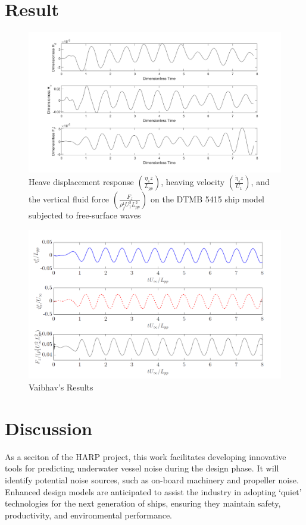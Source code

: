 \documentclass[12pt]{article} %
\begin{document}
\section{Result}
\begin{figure}[ht]
    \centering
    \includegraphics[width=1\textwidth]{Myresults.png}
    \caption{Heave displacement response \(\left(\frac{\eta_s z}{L_{pp}}\right)\), heaving velocity \(\left(\frac{\dot{\eta}_s z}{U_1}\right)\), and the vertical fluid force \(\left(\frac{F_z}{\rho_f^1 U_1^2 L_{pp}^2}\right)\) on the DTMB 5415 ship model subjected to free-surface waves
    }
\end{figure}
\begin{figure}[ht]
    \centering
    \includegraphics[width=1\textwidth]{Vabhav'sresults.png}
    \caption{Vaibhav's Results}
\end{figure}

\clearpage
\section{Discussion}
As a seciton of the HARP project, this work facilitates developing innovative tools for predicting underwater vessel noise during the design phase. It will identify potential noise sources, such as on-board machinery and propeller noise. Enhanced design models are anticipated to assist the industry in adopting `quiet' technologies for the next generation of ships, ensuring they maintain safety, productivity, and environmental performance.
\end{document}
